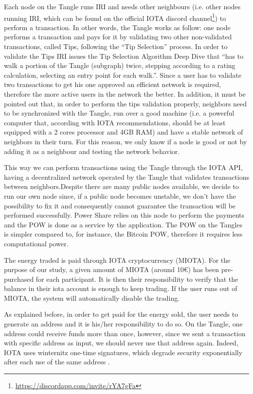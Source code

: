 Each node on the Tangle runs \ac{IRI} and needs other neighbours (i.e. other nodes running \ac{IRI}, which can be found on the official IOTA discord channel\footnote{\url{https://discordapp.com/invite/rYA7gFa}}) to perform a transaction. In other words, the Tangle works as follow: one node performs a transaction and pays for it by validating two other non-validated transactions, called Tips, following the “Tip Selection” process. In order to validate the Tips \ac{IRI} issues the Tip Selection Algorithm Deep Dive that “has to walk a portion of the Tangle (subgraph) twice, stepping according to a rating calculation, selecting an entry point for each walk.”\cite{iotatips}. Since a user has to validate two transactions to get his one approved an efficient network is required, therefore the more active users in the network the better. In addition, it must be pointed out that, in order to perform the tips validation properly, neighbors need to be synchronized with the Tangle, run over a good machine (i.e. a powerful computer that, according with IOTA recommendations, should be at least equipped with a 2 cores processor and 4GB RAM) and have a stable network of neighbors in their turn. For this reason, we only know if a node is good or not by adding it as a neighbour and testing the network behavior. 


This way we can perform transactions using the Tangle through the IOTA \ac{API}, having a decentralized network operated by the Tangle that validates transactions between neighbors.Despite there are many public nodes available, we decide to run our own node since, if a public node becomes unstable, we don't have the possibility to fix it and consequently cannot guarantee the transaction will be performed successfully.  Power Share relies on this node to perform the payments and the \ac{POW} is done as a service by the application. The POW on the Tangles is simpler compared to, for instance, the Bitcoin \ac{POW}, therefore it requires less computational power.



The energy traded is paid through IOTA cryptocurrency (MIOTA). For the purpose of our study, a given amount of MIOTA (around 10€) has been pre-purchased for each participant. It is then their responsibility to verify that the balance in their iota account is enough to keep trading. If the user runs out of MIOTA, the system will automatically disable the trading. 


As explained before, in order to get paid for the energy sold, the user needs to generate an address and it is his/her responsibility to do so. On the Tangle, one address could receive funds more than once, however, since we sent a transaction with specific address as input, we should never use that address again. Indeed, IOTA uses winternitz one-time signatures, which degrade security exponentially after each use of the same address \cite{iotaseeds}.



